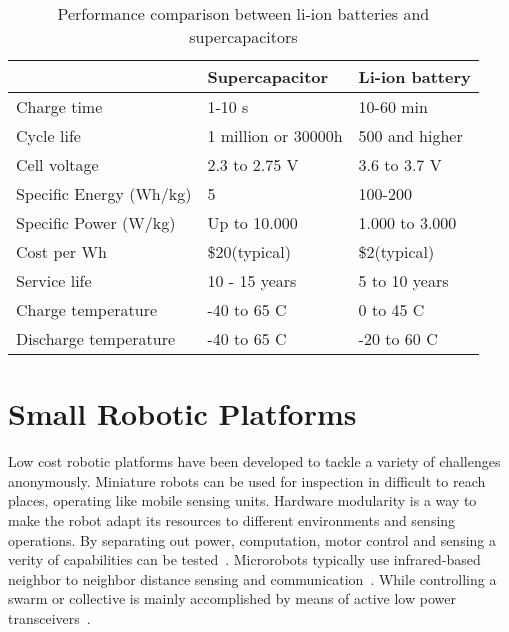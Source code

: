 \begin{table}[t]
	\centering
	\begin{threeparttable}
		\caption{Performance comparison between li-ion batteries and supercapacitors}
		\label{tab:battery_vs_supercap}
		\small
		\begin{tabular}{|l|l|l|}
			\hline
			& Supercapacitor & Li-ion battery \\
			\hline \hline
			Charge time & 1-10 s & 10-60 min \\
			Cycle life & 1 million or 30000h & 500 and higher \\
			Cell voltage & 2.3 to 2.75 V & 3.6 to 3.7 V \\
			Specific Energy (Wh/kg) & 5 & 100-200 \\
			Specific Power (W/kg) & Up to 10.000 & 1.000 to 3.000 \\
			Cost per Wh & \$20(typical) & \$2(typical) \\
			Service life & 10 - 15 years & 5 to 10 years \\
			Charge temperature & -40 to 65 \textdegree C & 0 to 45 \textdegree C \\
			Discharge temperature & -40 to 65 \textdegree C & -20 to 60 \textdegree C \\
			\hline
		\end{tabular}
	\end{threeparttable}
\end{table}


\section{Small Robotic Platforms}
\label{sec:robotic_platforms}



Low cost robotic platforms have been developed to tackle a variety of challenges anonymously.
Miniature robots can be used for inspection in difficult to reach places, operating like mobile sensing units.
Hardware modularity is a way to make the robot adapt its resources to different environments and sensing operations.
By separating out power, computation, motor control and sensing a verity of capabilities can be tested~\cite{sabelhaus_icra_2013, pickem_icra_2015, kim_iros_2016}.
Microrobots typically use infrared-based neighbor to neighbor distance sensing and communication~\cite{rubenstein_icra_2012, pickem_icra_2015, kim_iros_2016}.
While controlling a swarm or collective is mainly accomplished by means of active low power transceivers~\cite{sabelhaus_icra_2013, pickem_icra_2015, kim_iros_2016}. 

